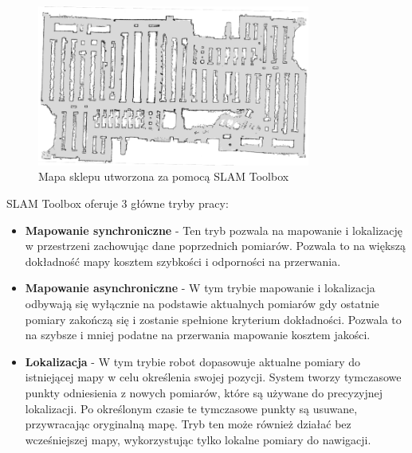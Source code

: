 \documentclass[a4paper,twoside,12pt]{book}
\begin{document}
\begin{figure}[h]
	\centering
	\includegraphics[width=0.8\textwidth]{images/sklep.png}
	\caption{Mapa sklepu utworzona za pomocą SLAM Toolbox \cite{bib:slamtoolbox}}
	\label{fig:sklep}
	\end{figure}

SLAM Toolbox oferuje 3 główne tryby pracy:
\begin{itemize}
	\item \textbf{Mapowanie synchroniczne} - Ten tryb pozwala na mapowanie i lokalizację w przestrzeni zachowując dane poprzednich pomiarów. Pozwala to na większą dokładność mapy kosztem szybkości i odporności na przerwania.
	\item \textbf{Mapowanie asynchroniczne} - W tym trybie mapowanie i lokalizacja odbywają się wyłącznie na podstawie aktualnych pomiarów gdy ostatnie pomiary zakończą się i zostanie spełnione kryterium dokładności. Pozwala to na szybsze i mniej podatne na przerwania mapowanie kosztem jakości.
	\item \textbf{Lokalizacja} - W tym trybie robot dopasowuje aktualne pomiary do istniejącej mapy w celu określenia swojej pozycji. System tworzy tymczasowe punkty odniesienia z nowych pomiarów, które są używane do precyzyjnej lokalizacji. Po określonym czasie te tymczasowe punkty są usuwane, przywracając oryginalną mapę. Tryb ten może również działać bez wcześniejszej mapy, wykorzystując tylko lokalne pomiary do nawigacji.
\end{itemize}

\newpage
\end{document}
